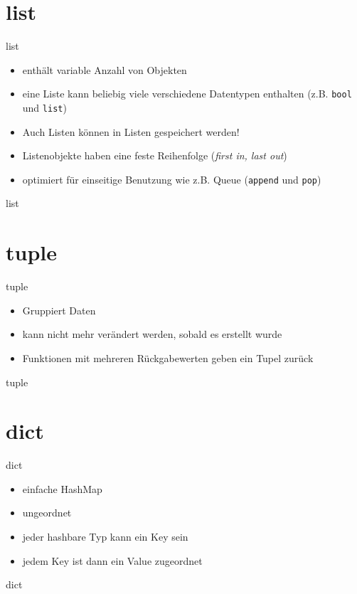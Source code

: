 \section{list}
\begin{frame}{list}

\begin{itemize}
	\item enthält variable Anzahl von Objekten
	\item eine Liste kann beliebig viele verschiedene Datentypen enthalten (z.B. \texttt{bool} und \texttt{list})
	\item Auch Listen können in Listen gespeichert werden!
	\item Listenobjekte haben eine feste Reihenfolge (\textit{first in, last out})
	\item optimiert für einseitige Benutzung wie z.B. Queue (\texttt{append} und \texttt{pop})
\end{itemize}
\end{frame}
\begin{frame}{list}
	
\end{frame}

\section{tuple}
\begin{frame}{tuple}
\begin{itemize}
	\item Gruppiert Daten
	\item kann nicht mehr verändert werden, sobald es erstellt wurde
	\item Funktionen mit mehreren Rückgabewerten geben ein Tupel zurück
\end{itemize}
\end{frame}
\begin{frame}{tuple}
	
\end{frame}


\section{dict}
\begin{frame}{dict}
\begin{itemize}
	\item einfache HashMap
	\item ungeordnet
	\item jeder hashbare Typ kann ein Key sein
	\item jedem Key ist dann ein Value zugeordnet
\end{itemize}
\end{frame}
\begin{frame}{dict}

\end{frame}

